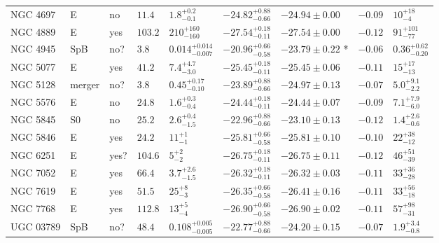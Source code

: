 \begin{table*}
\begin{center}
\begin{tabular}{lllllllll}
NGC 4697  &  E  &  no   &  $11.4$  &  $1.8_{-0.1}^{+0.2}$   &  $-24.82_{-0.66}^{+0.88}$   &  $-24.94 \pm 0.00$   &  $-0.09$  &  $10_{-4}^{+18}$   \\ 
NGC 4889  &  E  &  yes   &  $103.2$  &  $210_{-160}^{+160}$   &  $-27.54_{-0.11}^{+0.18}$   &  $-27.54 \pm 0.00$   &  $-0.12$  &  $91_{-77}^{+101}$   \\ 
NGC 4945  &  SpB  &  no?  &  $3.8$  &  $0.014_{-0.007}^{+0.014}$   &  $-20.96_{-0.58}^{+0.66}$   &  $-23.79 \pm 0.22$  *  &  $-0.06$  &  $0.36_{-0.20}^{+0.62}$   \\ 
NGC 5077  &  E  &  yes   &  $41.2$  &  $7.4_{-3.0}^{+4.7}$   &  $-25.45_{-0.11}^{+0.18}$   &  $-25.45 \pm 0.06$   &  $-0.11$  &  $15_{-13}^{+17}$   \\ 
NGC 5128  &  merger  &  no?  &  $3.8$  &  $0.45_{-0.10}^{+0.17}$   &  $-23.89_{-0.66}^{+0.88}$   &  $-24.97 \pm 0.13$   &  $-0.07$  &  $5.0_{-2.2}^{+9.1}$   \\ 
NGC 5576  &  E  &  no   &  $24.8$  &  $1.6_{-0.4}^{+0.3}$   &  $-24.44_{-0.11}^{+0.18}$   &  $-24.44 \pm 0.07$   &  $-0.09$  &  $7.1_{-6.0}^{+7.9}$   \\ 
NGC 5845  &  S0  &  no   &  $25.2$  &  $2.6_{-1.5}^{+0.4}$   &  $-22.96_{-0.66}^{+0.88}$   &  $-23.10 \pm 0.13$   &  $-0.12$  &  $1.4_{-0.6}^{+2.6}$   \\ 
NGC 5846  &  E  &  yes   &  $24.2$  &  $11_{-1}^{+1}$   &  $-25.81_{-0.58}^{+0.66}$   &  $-25.81 \pm 0.10$   &  $-0.10$  &  $22_{-12}^{+38}$   \\ 
NGC 6251  &  E  &  yes?  &  $104.6$  &  $5_{-2}^{+2}$   &  $-26.75_{-0.11}^{+0.18}$   &  $-26.75 \pm 0.11$   &  $-0.12$  &  $46_{-39}^{+51}$   \\ 
NGC 7052  &  E  &  yes   &  $66.4$  &  $3.7_{-1.5}^{+2.6}$   &  $-26.32_{-0.11}^{+0.18}$   &  $-26.32 \pm 0.03$   &  $-0.11$  &  $33_{-28}^{+36}$   \\ 
NGC 7619  &  E  &  yes   &  $51.5$  &  $25_{-3}^{+8}$   &  $-26.35_{-0.58}^{+0.66}$   &  $-26.41 \pm 0.16$   &  $-0.11$  &  $33_{-18}^{+56}$   \\ 
NGC 7768  &  E  &  yes   &  $112.8$  &  $13_{-4}^{+5}$   &  $-26.90_{-0.58}^{+0.66}$   &  $-26.90 \pm 0.02$   &  $-0.11$  &  $57_{-31}^{+98}$   \\ 
UGC 03789  &  SpB  &  no?  &  $48.4$  &  $0.108_{-0.005}^{+0.005}$   &  $-22.77_{-0.66}^{+0.88}$   &  $-24.20 \pm 0.15$   &  $-0.07$  &  $1.9_{-0.8}^{+3.4}$   \\ 
\hline         
\end{tabular}   
\end{center}    
\end{table*}    
